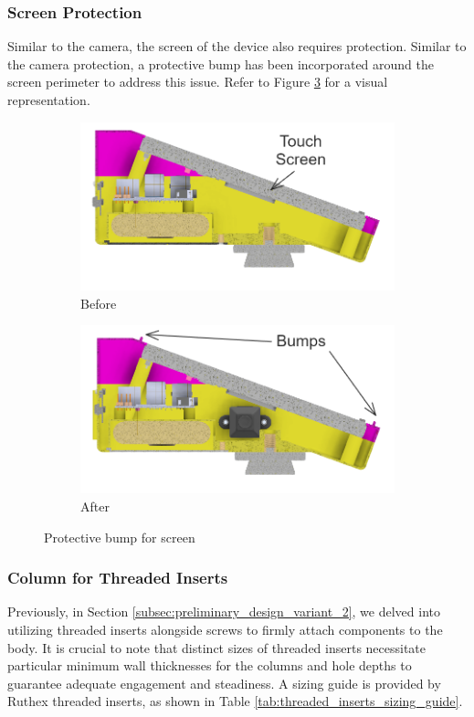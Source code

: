 \subsubsection{Screen Protection}
Similar to the camera, the screen of the device also requires protection. Similar to the camera protection, a protective bump has been incorporated around the screen perimeter to address this issue. Refer to Figure \ref{fig:detail_screen_protect} for a visual representation.

\begin{figure}[!ht]
    \centering
    \begin{subfigure}[c]{0.47\textwidth}
        \begin{minipage}{\textwidth}
            \centering
            \includegraphics[height=3.5 cm]{texs/Part1/chapter4/image/d21.png}
        \end{minipage}
        \caption{Before}
        \label{fig:detail_screen_before}
    \end{subfigure}
    \begin{subfigure}[c]{0.47\textwidth}
        \begin{minipage}{\textwidth}
            \centering
            \includegraphics[height=3.5 cm]{texs/Part1/chapter4/image/d22.png}
        \end{minipage}
        \caption{After}
        \label{fig:detail_screen_after}
    \end{subfigure}
    \caption{Protective bump for screen}
    \label{fig:detail_screen_protect}
\end{figure}

\subsubsection{Column for Threaded Inserts}
Previously, in Section \ref{subsec:preliminary_design_variant_2}, we delved into utilizing threaded inserts alongside screws to firmly attach components to the body. It is crucial to note that distinct sizes of threaded inserts necessitate particular minimum wall thicknesses for the columns and hole depths to guarantee adequate engagement and steadiness. A sizing guide is provided by Ruthex threaded inserts, as shown in Table \ref{tab:threaded_inserts_sizing_guide}.

